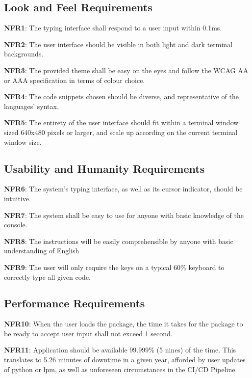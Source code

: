 \documentclass[12pt, titlepage]{article}
\begin{document}
\subsection{Look and Feel Requirements}

\noindent \textbf{NFR1}: The typing interface shall respond to a user input within 0.1ms.

\noindent \textbf{NFR2}: The user interface should be visible in both light and dark terminal backgrounds.

\noindent \textbf{NFR3}: The provided theme shall be easy on the eyes and follow the WCAG AA or AAA specification in terms of colour choice.

\noindent \textbf{NFR4}: The code snippets chosen should be diverse, and representative of the languages' syntax.

\noindent \textbf{NFR5}: The entirety of the user interface should fit within a terminal window sized 640x480 pixels or larger, and scale up according on the current terminal window size.

\subsection{Usability and Humanity Requirements}

\noindent \textbf{NFR6}: The system's typing interface, as well as its cursor indicator, should be intuitive.

\noindent \textbf{NFR7}: The system shall be easy to use for anyone with basic knowledge of the console.

\noindent \textbf{NFR8}: The instructions will be easily comprehensible by anyone with basic understanding of English

\noindent \textbf{NFR9}: The user will only require the keys on a typical 60\% keyboard to correctly type all given code.

\subsection{Performance Requirements}
\noindent \textbf{NFR10}: When the user loads the package, the time it takes for the package to be ready to accept user input shall not exceed 1 second.

\noindent \textbf{NFR11}: Application should be available 99.999\% (5 nines) of the time. This translates to 5.26 minutes of downtime in a given year, afforded by user updates of python or lpm, as well as unforeseen circumstances in the CI/CD Pipeline.
\end{document}
